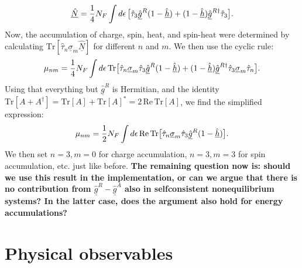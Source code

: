 \begin{equation}
  \underline{\hat{N}} = \frac{1}{4} N_F \int d\epsilon \, \big[ \hat{\tau}_3 \underline{\hat{g}}^R (1-\underline{\hat{h}}) + (1-\underline{\hat{h}}) \underline{\hat{g}}^{R\dagger} \hat{\tau}_3 \big].
\end{equation}
Now, the accumulation of charge, spin, heat, and spin-heat were determined by calculating $\text{Tr}[\hat{\tau}_n \underline{\sigma}_m \underline{\hat{N}}]$ for different $n$ and $m$.
We then use the cyclic rule:
\begin{equation}
  \mu_{nm} = \frac{1}{4} N_F \int d\epsilon \, \text{Tr}\big[ \hat{\tau}_n \underline{\sigma}_m \hat{\tau}_3 \underline{\hat{g}}^R (1-\underline{\hat{h}}) + (1-\underline{\hat{h}}) \underline{\hat{g}}^{R\dagger} \hat{\tau}_3 \underline{\sigma}_m \hat{\tau}_n\big].
\end{equation}
Using that everything but $\underline{\hat{g}}^R$ is Hermitian, and the identity $\text{Tr}[A+A^\dagger] = \text{Tr}[A] + \text{Tr}[A]^* = 2\,\text{Re}\,\text{Tr}[A]$, we find the simplified expression:
\begin{equation}
  \mu_{nm} = \frac{1}{2} N_F \int d\epsilon \, \text{Re}\,\text{Tr}\big[ \hat{\tau}_n \underline{\sigma}_m \hat{\tau}_3 \underline{\hat{g}}^R (1-\underline{\hat{h}}) \big].
\end{equation}
We then set $n=3, m=0$ for charge accumulation, $n=3, m=3$ for spin accumulation, etc. just like before.
\textbf{The remaining question now is: should we use this result in the implementation, or can we argue that there is no contribution from $\underline{\hat{g}}^R-\underline{\hat{g}}^A$ also in selfconsistent nonequilibrium systems? In the latter case, does the argument also hold for energy accumulations?}


\chapter{Physical observables}
